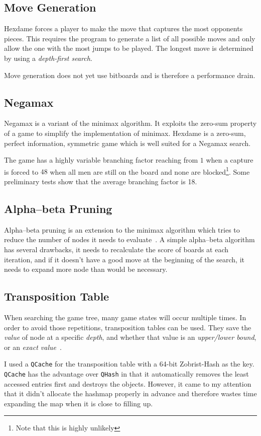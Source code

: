 \documentclass[a4paper,10pt]{article}
\begin{document}
\subsection*{Move Generation}
Hexdame forces a player to make the move that captures the most opponents pieces. This requires the program to generate a list of all possible moves and only allow the one with the most jumps to be played. The longest move is determined by using a \emph{depth-first search}.

Move generation does not yet use bitboards and is therefore a performance drain.

\subsection*{Negamax}
Negamax is a variant of the minimax algorithm. It exploits the zero-sum property of a game to simplify the implementation of minimax. Hexdame is a zero-sum, perfect information, symmetric game which is well suited for a Negamax search.

The game has a highly variable branching factor reaching from $1$ when a capture is forced to $48$ when all men are still on the board and none are blocked\footnote{Note that this is highly unlikely}. Some preliminary tests show that the average branching factor is 18.

\subsection*{Alpha--beta Pruning}
Alpha--beta pruning is an extension to the minimax algorithm which tries to reduce the number of nodes it needs to evaluate~\cite{Brudno1963,Knuth1976}. A simple alpha--beta algorithm has several drawbacks, it needs to recalculate the score of boards at each iteration, and if it doesn't have a good move at the beginning of the search, it needs to expand more node than would be necessary.

\subsection*{Transposition Table}
When searching the game tree, many game states will occur multiple times. In order to avoid those repetitions, transposition tables can be used. They save the \emph{value} of node at a specific \emph{depth}, and whether that value is an \emph{upper/lower bound}, or an \emph{exact value}~\cite{Marsland1995}.

I used a \texttt{QCache} for the transposition table with a 64-bit Zobrist-Hash as the key. \texttt{QCache} has the advantage over \texttt{QHash} in that it automatically removes the least accessed entries first and destroys the objects. However, it came to my attention that it didn't allocate the hashmap properly in advance and therefore wastes time expanding the map when it is close to filling up.
\end{document}
